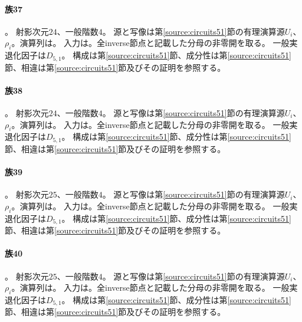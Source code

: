 \paragraph{族37}\label{catalogue:T37}
。
射影次元$24$、一般階数$4$。
源と写像は第\ref{source:circuits51}節の有理演算源$U_i$、$\rho_i$。演算列は。
入力は。全inverse節点と記載した分母の非零開を取る。
一般実退化因子は$D_{5,1}$。
構成は第\ref{source:circuits51}節、成分性は第\ref{source:circuits51}節、相違は第\ref{source:circuits51}節及びその証明を参照する。

\paragraph{族38}\label{catalogue:T38}
。
射影次元$24$、一般階数$4$。
源と写像は第\ref{source:circuits51}節の有理演算源$U_i$、$\rho_i$。演算列は。
入力は。全inverse節点と記載した分母の非零開を取る。
一般実退化因子は$D_{5,1}$。
構成は第\ref{source:circuits51}節、成分性は第\ref{source:circuits51}節、相違は第\ref{source:circuits51}節及びその証明を参照する。

\paragraph{族39}\label{catalogue:T39}
。
射影次元$25$、一般階数$4$。
源と写像は第\ref{source:circuits51}節の有理演算源$U_i$、$\rho_i$。演算列は。
入力は。全inverse節点と記載した分母の非零開を取る。
一般実退化因子は$D_{5,1}$。
構成は第\ref{source:circuits51}節、成分性は第\ref{source:circuits51}節、相違は第\ref{source:circuits51}節及びその証明を参照する。

\paragraph{族40}\label{catalogue:T40}
。
射影次元$25$、一般階数$4$。
源と写像は第\ref{source:circuits51}節の有理演算源$U_i$、$\rho_i$。演算列は。
入力は。全inverse節点と記載した分母の非零開を取る。
一般実退化因子は$D_{5,1}$。
構成は第\ref{source:circuits51}節、成分性は第\ref{source:circuits51}節、相違は第\ref{source:circuits51}節及びその証明を参照する。

